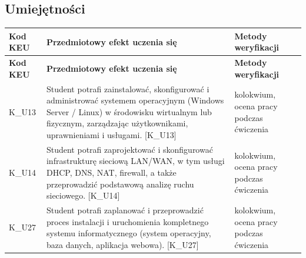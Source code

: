 \documentclass[12pt, a4paper]{article}
\newcommand{\thdrule}{\noalign{\global\setlength{\extrarowheight}{0pt}}}
\newcommand{\thdend}{\noalign{\global\setlength{\extrarowheight}{3pt}}}
\begin{document}
\subsection*{Umiejętności}
{\scriptsize
\begin{longtable}{m{1.6cm}m{9.0cm}m{4.2cm}}
\thdrule\toprule
\rowcolor{pjatkRed} {\color{white}\footnotesize\textbf{\vphantom{Ag}Kod KEU}} & {\color{white}\footnotesize\textbf{\vphantom{Ag}Przedmiotowy efekt uczenia się}} & {\color{white}\footnotesize\textbf{\vphantom{Ag}Metody weryfikacji}} \\
\midrule\thdend
\endfirsthead
\thdrule\toprule
\rowcolor{pjatkRed} {\color{white}\footnotesize\textbf{\vphantom{Ag}Kod KEU}} & {\color{white}\footnotesize\textbf{\vphantom{Ag}Przedmiotowy efekt uczenia się}} & {\color{white}\footnotesize\textbf{\vphantom{Ag}Metody weryfikacji}} \\
\midrule\thdend
\endhead
  \rowcolor{tableRowLight} K\_U13 & Student potrafi zainstalować, skonfigurować i administrować systemem operacyjnym (Windows Server / Linux) w środowisku wirtualnym lub fizycznym, zarządzając użytkownikami, uprawnieniami i usługami. {[}K\_U13{]} & kolokwium, ocena pracy podczas ćwiczenia \\
  \rowcolor{tableRowAlt} K\_U14 & Student potrafi zaprojektować i skonfigurować infrastrukturę sieciową LAN/WAN, w tym usługi DHCP, DNS, NAT, firewall, a także przeprowadzić podstawową analizę ruchu sieciowego. {[}K\_U14{]} & kolokwium, ocena pracy podczas ćwiczenia \\
  \rowcolor{tableRowLight} K\_U27 & Student potrafi zaplanować i przeprowadzić proces instalacji i uruchomienia kompletnego systemu informatycznego (system operacyjny, baza danych, aplikacja webowa). {[}K\_U27{]} & kolokwium, ocena pracy podczas ćwiczenia \\
\bottomrule
\end{longtable}}
\end{document}
